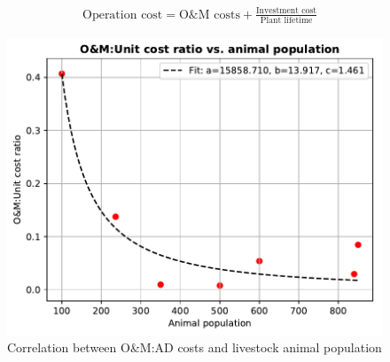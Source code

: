 \documentclass[10pt,a4paper]{article}
\begin{document}
\begin{align} \label{eq:OM_inv_costs}
& \text{Operation cost} = \text{O\&M costs} + \frac{\text{Investment cost}}{\text{Plant lifetime}} 
\end{align}

\begin{figure}[H]
	\centering
	\includegraphics[width=0.6\linewidth]{AD_size_OM_Unit_cost} 
	\caption{Correlation between  O\&M:AD costs and livestock animal population}
	\label{fig:AD_size_OM_Unit_cost}
\end{figure}
\end{document}
